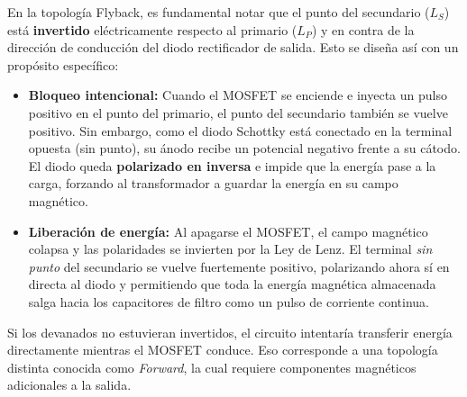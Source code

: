 \documentclass[12pt, a4paper]{article}
\begin{document}
En la topología Flyback, es fundamental notar que el punto del secundario ($L_S$) está \textbf{invertido} eléctricamente respecto al primario ($L_P$) y en contra de la dirección de conducción del diodo rectificador de salida. Esto se diseña así con un propósito específico:
\begin{itemize}
    \item \textbf{Bloqueo intencional:} Cuando el MOSFET se enciende e inyecta un pulso positivo en el punto del primario, el punto del secundario también se vuelve positivo. Sin embargo, como el diodo Schottky está conectado en la terminal opuesta (sin punto), su ánodo recibe un potencial negativo frente a su cátodo. El diodo queda \textbf{polarizado en inversa} e impide que la energía pase a la carga, forzando al transformador a guardar la energía en su campo magnético.
    \item \textbf{Liberación de energía:} Al apagarse el MOSFET, el campo magnético colapsa y las polaridades se invierten por la Ley de Lenz. El terminal \textit{sin punto} del secundario se vuelve fuertemente positivo, polarizando ahora sí en directa al diodo y permitiendo que toda la energía magnética almacenada salga hacia los capacitores de filtro como un pulso de corriente continua.
\end{itemize}
Si los devanados no estuvieran invertidos, el circuito intentaría transferir energía directamente mientras el MOSFET conduce. Eso corresponde a una topología distinta conocida como \textit{Forward}, la cual requiere componentes magnéticos adicionales a la salida.
\end{document}

